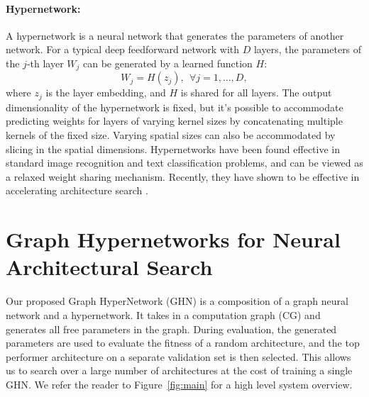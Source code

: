 \documentclass{article} %
\begin{document}
\paragraph{Hypernetwork:}
A hypernetwork \citep{ha2016hypernetworks} is a neural network that generates the parameters of
another network. For a typical deep feedforward network with $D$ layers, the parameters of the
$j$-th layer $W_j$ can be generated by a learned function $H$:
\begin{equation}
W_j = H(z_j), \ \ \forall j = 1, \dots, D,
\end{equation}
where $z_j$ is the layer embedding, and $H$ is shared for all layers. The output dimensionality of
the hypernetwork is fixed, but it's possible to accommodate predicting weights for layers of varying
kernel sizes by concatenating multiple kernels of the fixed size. Varying spatial sizes can also be
accommodated by slicing in the spatial dimensions. Hypernetworks have been found effective in
standard image recognition and text classification problems, and can be viewed as a relaxed weight
sharing mechanism. Recently, they have shown to be effective in accelerating architecture search
\citep{brock2017smash}.

\section{Graph Hypernetworks for Neural Architectural Search}
Our proposed Graph HyperNetwork (GHN) is a composition of a graph neural network and a hypernetwork.
It takes in a computation graph (CG) and generates all free parameters in the graph. During
evaluation, the generated parameters are used to evaluate the fitness of a random architecture, and
the top performer architecture on a separate validation set is then selected. This allows us to
search over a large number of architectures at the cost of training a single GHN. We refer the
reader to Figure~\ref{fig:main} for a high level system overview.
\end{document}
